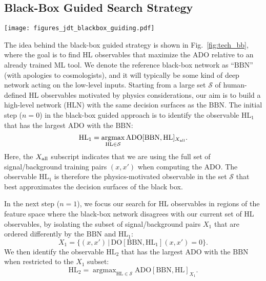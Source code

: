 \documentclass[aps,prd,twocolumn,superscriptaddress,preprintnumbers,nofootinbib,longbibliography,floatfix]{revtex4-1}
\newcommand{\BBN}{\text{BBN}}
\newcommand{\HLN}{\text{HLN}}
\newcommand{\DO}{\text{DO}}
\newcommand{\HL}{\text{HL}}
\newcommand{\ADO}{\text{ADO}}
\DeclareMathOperator*{\argmax}{argmax}
\newcommand{\Fig}[1]{Fig.~\ref{#1}}
\newcommand{\Sec}[1]{Sec.~\ref{#1}}
\begin{document}
\subsection{Black-Box Guided Search Strategy}
\label{subsec:strategy_blackbox}
\begin{figure*}[ht]
	\centering
	\texttt{[image: figures\_jdt\_blackbox\_guiding.pdf]}
	\caption{Schematic of the black-box guided search in \Sec{subsec:strategy_blackbox}.
	In each iteration of this strategy, the relative decision ordering of signal/background pairs between the fixed black-box network (BBN, black triangle) and a trainable network of HL observables (HLN, white triangle) is used to identify the subset (red box) in which pairs are differently ordered. From a large space of HL observables (circles), the one with the largest ADO in the misordered space (blue circle) is selected for the next iteration. The schematic above corresponds to the $n=4$ iteration. Note that the BBN is not retrained in each iteration, but the network of HL observables is.}
	\label{fig:tech_bb}
\end{figure*}

The idea behind the black-box guided strategy is shown in \Fig{fig:tech_bb}, where the goal is to find HL observables that maximize the ADO relative to an already trained ML tool. We denote the reference black-box network as ``$\BBN$'' (with apologies to cosmologists), and it will typically be some kind of deep network acting on the low-level  inputs. Starting from a large set $\mathcal{S}$ of human-defined HL observables motivated by physics considerations, our aim is to build a high-level network ($\HLN$) with the same decision surfaces as the $\BBN$. The initial step ($n=0$) in the black-box guided approach is to identify the observable $\HL_1$ that has the largest ADO with the $\BBN$:
\begin{equation}
	\label{eq:HL1_def}
	\HL_1 = \argmax_{\HL \in \mathcal{S}} \ADO[\BBN, \HL]_{X_{\rm all}}.
\end{equation}
Here, the $X_{\rm all}$ subscript indicates that we are using the full set of signal/background training pairs $(x,x')$ when computing the ADO. The observable $\HL_1$ is therefore the physics-motivated observable in the set $\mathcal{S}$ that best approximates the decision surfaces of the black box.

In the next step ($n=1$), we focus our search for HL observables in regions of the feature space where the black-box network disagrees with our current set of HL observables, by isolating the subset of signal/background pairs $X_1$ that are ordered differently by the $\BBN$ and $\HL_1$:
\begin{equation}
	X_1 = \Big\{ (x,x') \, \Big| \, \DO[\BBN, \HL_1](x,x') = 0 \Big\}.
\end{equation}
We then identify the observable $\HL_2$ that has the largest ADO with the $\BBN$ when restricted to the $X_1$ subset:
\begin{equation}
	\label{eq:HL2_def}
	\HL_2 = \argmax_{\HL \in \mathcal{S}} \ADO[\BBN, \HL]_{X_1}.
\end{equation}
\end{document}
